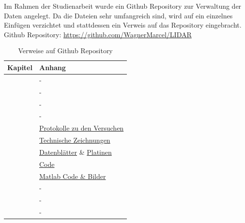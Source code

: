 \newpage
{}
Im Rahmen der Studienarbeit wurde ein Github Repository zur Verwaltung der Daten angelegt. Da die Dateien sehr umfangreich sind, wird auf ein einzelnes Einfügen verzichtet und stattdessen ein Verweis auf das Repository eingebracht.\\
Github Repository: \href{https://github.com/WagnerMarcel/LIDAR}{https://github.com/WagnerMarcel/LIDAR}
\begin{table}[H]
	\centering
	\caption{Verweise auf Github Repository}
	\begin{tabular}{|l|l|}
		\hline
		\textbf{Kapitel} & \textbf{Anhang} \\\hline
		\fullref{chap:einleitung} & - \\\hline
		\fullref{chap:grundlagen_et} & - \\\hline
		\fullref{chap:grund_lidar} & - \\\hline
		\fullref{chap:stand_der_technik} & -\\\hline
		\fullref{chap:machbarkeitsstudie} & \href{https://github.com/WagnerMarcel/LIDAR/tree/master/04_Protokolle}{Protokolle zu den Versuchen} \\\hline
		\fullref{chap:mechanik} & \href{https://github.com/WagnerMarcel/LIDAR/tree/master/08_Mechanik}{Technische Zeichnungen} \\\hline
		\fullref{chap:hardware} & \href{https://github.com/WagnerMarcel/LIDAR/tree/master/05_Datenblätter/VL53L1X}{Datenblätter} \& \href{https://github.com/WagnerMarcel/LIDAR/tree/master/09_Platinen}{Platinen}\\\hline
		\fullref{chap:code} & \href{https://github.com/WagnerMarcel/LIDAR/tree/master/07_Code}{Code} \\\hline
		\fullref{chap:auswertung_matlab} & \href{https://github.com/WagnerMarcel/LIDAR/tree/master/11_Auswertung}{Matlab Code \& Bilder} \\\hline
		\fullref{chap:validierung} & - \\\hline
		\fullref{chap:fazit} & - \\\hline
		\fullref{chap:ausblick} & - \\\hline
	\end{tabular}
\end{table}

\newpage
{}

